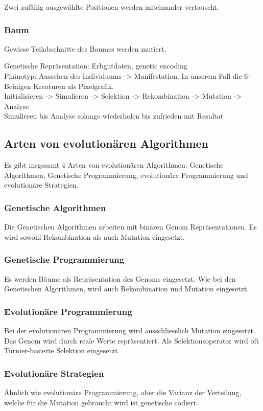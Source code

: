         Zwei zufällig ausgewählte Positionen werden miteinander vertauscht.

      \subsubsection{Baum}

        Gewisse Teilabschnitte des Baumes werden mutiert.

    Genetische Repräsentation: Erbgutdaten, genetic encoding
    \\
    Phänotyp: Aussehen des Individuums -> Manifestation. In unserem Fall die 6-Beinigen Kreaturen als Pixelgrafik.
    \\
    Initialisieren -> Simulieren -> Selektion -> Rekombination -> Mutation -> Analyse
    \\
    Simulieren bis Analyse solange wiederholen bis zufrieden mit Resultat

  \subsection{Arten von evolutionären Algorithmen\label{sub:artenEvAlgos}}

    Es gibt insgesamt 4 Arten von evolutionären Algorithmen:
    Genetische Algorithmen, Genetische Programmierung, evolutionäre Programmierung
    und evolutionäre Strategien.

    \subsubsection{Genetische Algorithmen\label{item:genAlgo}}

      Die Genetischen Algorithmen arbeiten mit binären Genom Repräsentationen.
      Es wird sowohl Rekombination als auch Mutation eingesetzt.

    \subsubsection{Genetische Programmierung\label{item:genProg}}

      Es werden Bäume als Repräsentation des Genoms eingesetzt. Wie bei den Genetischen Algorithmen,
      wird auch Rekombination und Mutation eingesetzt.

    \subsubsection{Evolutionäre Programmierung\label{item:evProg}}

      Bei der evolutionären Programmierung wird ausschliesslich Mutation eingesetzt.
      Das Genom wird durch reale Werte repräsentiert. Als Selektionsoperator wird
      oft Turnier-basierte Selektion eingesetzt.

    \subsubsection{Evolutionäre Strategien\label{item:evStrat}}

        Ähnlich wie evolutionäre Programmierung, aber die Varianz der Verteilung,
        welche für die Mutation gebraucht wird ist genetische codiert.
